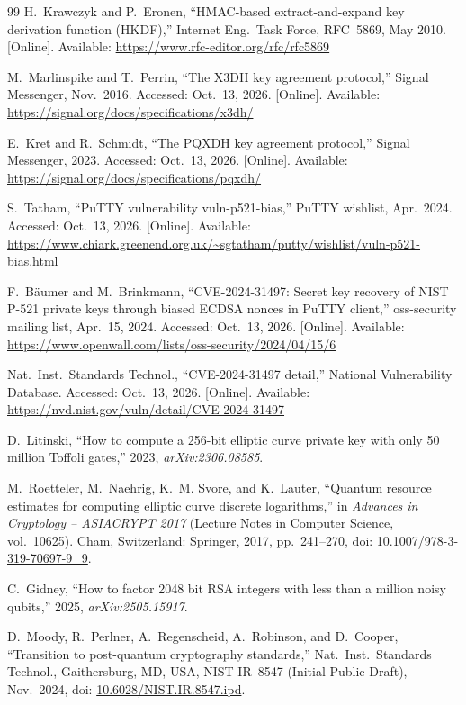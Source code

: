 \documentclass[11pt,a4paper]{article}
\begin{document}
\begin{thebibliography}{99}
H.~Krawczyk and P.~Eronen, ``HMAC-based extract-and-expand key derivation function (HKDF),'' Internet Eng.\ Task Force, RFC~5869, May 2010. [Online]. Available: \url{https://www.rfc-editor.org/rfc/rfc5869}

M.~Marlinspike and T.~Perrin, ``The X3DH key agreement protocol,'' Signal Messenger, Nov.~2016. Accessed: Oct.~13, 2026. [Online]. Available: \url{https://signal.org/docs/specifications/x3dh/}

E.~Kret and R.~Schmidt, ``The PQXDH key agreement protocol,'' Signal Messenger, 2023. Accessed: Oct.~13, 2026. [Online]. Available: \url{https://signal.org/docs/specifications/pqxdh/}

S.~Tatham, ``PuTTY vulnerability vuln-p521-bias,'' PuTTY wishlist, Apr.~2024. Accessed: Oct.~13, 2026. [Online]. Available: \url{https://www.chiark.greenend.org.uk/~sgtatham/putty/wishlist/vuln-p521-bias.html}

F.~B\"aumer and M.~Brinkmann, ``CVE-2024-31497: Secret key recovery of NIST P-521 private keys through biased ECDSA nonces in PuTTY client,'' oss-security mailing list, Apr.~15, 2024. Accessed: Oct.~13, 2026. [Online]. Available: \url{https://www.openwall.com/lists/oss-security/2024/04/15/6}

Nat.\ Inst.\ Standards Technol., ``CVE-2024-31497 detail,'' National Vulnerability Database. Accessed: Oct.~13, 2026. [Online]. Available: \url{https://nvd.nist.gov/vuln/detail/CVE-2024-31497}

D.~Litinski, ``How to compute a 256-bit elliptic curve private key with only 50 million Toffoli gates,'' 2023, \emph{arXiv:2306.08585}.

M.~Roetteler, M.~Naehrig, K.~M. Svore, and K.~Lauter, ``Quantum resource estimates for computing elliptic curve discrete logarithms,'' in \emph{Advances in Cryptology -- ASIACRYPT 2017} (Lecture Notes in Computer Science, vol.~10625). Cham, Switzerland: Springer, 2017, pp.~241--270, doi: \href{https://doi.org/10.1007/978-3-319-70697-9_9}{10.1007/978-3-319-70697-9\_9}.

C.~Gidney, ``How to factor 2048 bit RSA integers with less than a million noisy qubits,'' 2025, \emph{arXiv:2505.15917}.

D.~Moody, R.~Perlner, A.~Regenscheid, A.~Robinson, and D.~Cooper, ``Transition to post-quantum cryptography standards,'' Nat.\ Inst.\ Standards Technol., Gaithersburg, MD, USA, NIST IR~8547 (Initial Public Draft), Nov.~2024, doi: \href{https://doi.org/10.6028/NIST.IR.8547.ipd}{10.6028/NIST.IR.8547.ipd}.


\end{thebibliography}
\end{document}
